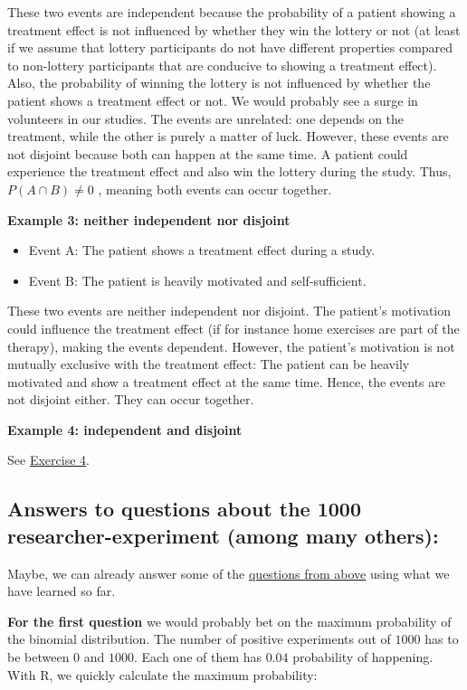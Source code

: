\documentclass[
]{book}
\providecommand{\tightlist}{%
  \setlength{\itemsep}{0pt}\setlength{\parskip}{0pt}}
\begin{document}
These two events are independent because the probability of a patient showing a treatment effect is not influenced by whether they win the lottery or not
(at least if we assume that lottery participants do not have different properties compared to non-lottery participants that are conducive to showing a treatment effect).
Also, the probability of winning the lottery is not influenced by whether the patient shows a treatment effect or not. We would probably see a surge
in volunteers in our studies.
The events are unrelated: one depends on the treatment, while the other is purely a matter of luck.
However, these events are not disjoint because both can happen at the same time.
A patient could experience the treatment effect and also win the lottery during the study. Thus, \(P(A \cap B) \neq 0\) , meaning both events can occur together.

\textbf{Example 3: neither independent nor disjoint}

\begin{itemize}
\tightlist
\item
  Event A: The patient shows a treatment effect during a study.
\item
  Event B: The patient is heavily motivated and self-sufficient.
\end{itemize}

These two events are neither independent nor disjoint. The patient's motivation could influence the treatment effect (if for instance home exercises
are part of the therapy), making the events dependent.
However, the patient's motivation is not mutually exclusive with the treatment effect: The patient can be heavily motivated and show a
treatment effect at the same time.
Hence, the events are not disjoint either. They can occur together.

\textbf{Example 4: independent and disjoint}

See \hyperref[exercise4]{Exercise 4}.

\subsection{Answers to questions about the 1000 researcher-experiment (among many others):}\label{Answers_Questions_about_the_1000-researcher_experiment}

Maybe, we can already answer some of the \hyperref[Questions_about_the_1000-researcher_experiment]{questions from above} using what we have learned so far.

\textbf{For the first question} we would probably bet on the maximum probability of the binomial distribution. The number of positive experiments out of \(1000\) has to be between \(0\) and \(1000\).
Each one of them has \(0.04\) probability of happening. With R, we quickly calculate the maximum probability:
\end{document}
